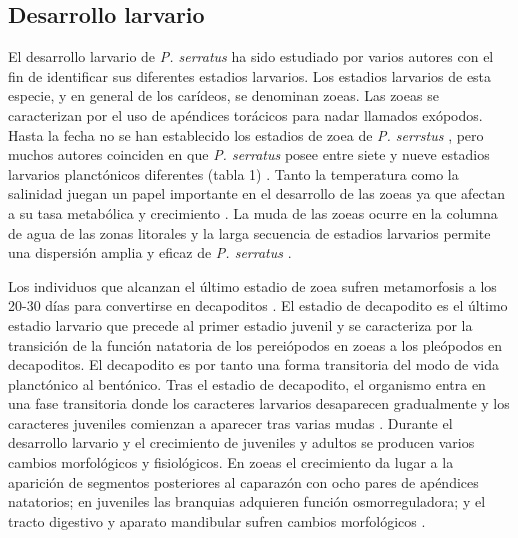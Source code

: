 \documentclass[a4paper]{article}
\begin{document}
\subsection{Desarrollo larvario}
El desarrollo larvario de \textit{P. serratus} ha sido estudiado por varios autores con el fin de identificar sus diferentes estadios larvarios. Los estadios larvarios de esta especie, y en general de los carídeos, se denominan zoeas. Las zoeas se caracterizan por el uso de apéndices torácicos para nadar llamados exópodos. Hasta la fecha no se han establecido los estadios de zoea de \textit{P. serrstus} \citep{Gonzalez2001}, pero muchos autores coinciden en que \textit{P. serratus} posee entre siete y nueve estadios larvarios planctónicos diferentes (tabla 1) \citep{Fincham1986, Ramonell1987}. Tanto la temperatura como la salinidad juegan un papel importante en el desarrollo de las zoeas ya que afectan a su tasa metabólica y crecimiento \citep{Gonzalez2014}. La muda de las zoeas ocurre en la columna de agua de las zonas litorales \citep{Forster1951} y la larga secuencia de estadios larvarios permite una dispersión amplia y eficaz de \textit{P. serratus} \citep{Fincham1986}.\par Los individuos que alcanzan el último estadio de zoea sufren metamorfosis a los 20-30 días para convertirse en decapoditos \citep{Bellon1978}. El estadio de decapodito es el último estadio larvario que precede al primer estadio juvenil \citep{Anger2001} y se caracteriza por la transición de la función natatoria de los pereiópodos en zoeas a los pleópodos en decapoditos. El decapodito es por tanto una forma transitoria del modo de vida planctónico al bentónico. Tras el estadio de decapodito, el organismo entra en una fase transitoria donde los caracteres larvarios desaparecen gradualmente y los caracteres juveniles comienzan a aparecer tras varias mudas \citep{Anger2001}. Durante el desarrollo larvario y el crecimiento de juveniles y adultos se producen varios cambios morfológicos y fisiológicos. En zoeas el crecimiento da lugar a la aparición de segmentos posteriores al caparazón con ocho pares de apéndices natatorios; en juveniles las branquias adquieren función osmorreguladora; y el tracto digestivo y aparato mandibular sufren cambios morfológicos \citep{Factor1981, Bouaricha1994, Ruppert1996}.
\end{document}
